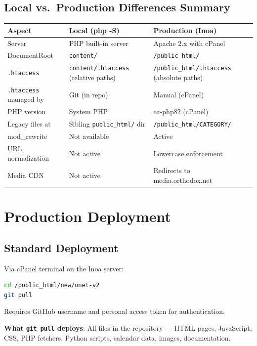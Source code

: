 \documentclass[12pt]{article}
\begin{document}
\subsection{Local vs.\ Production Differences Summary}

\begin{longtable}{p{3cm}p{4.8cm}p{4.8cm}}
\toprule
\textbf{Aspect} & \textbf{Local (php -S)} & \textbf{Production (Inoa)} \\
\midrule
Server & PHP built-in server & Apache 2.x with cPanel \\
DocumentRoot & \texttt{content/} & \texttt{/public\_html/} \\
\texttt{.htaccess} & \texttt{content/.htaccess} (relative paths) & \texttt{/public\_html/.htaccess} (absolute paths) \\
\texttt{.htaccess} managed by & Git (in repo) & Manual (cPanel) \\
PHP version & System PHP & ea-php82 (cPanel) \\
Legacy files at & Sibling \texttt{public\_html/} dir & \texttt{/public\_html/CATEGORY/} \\
mod\_rewrite & Not available & Active \\
URL normalization & Not active & Lowercase enforcement \\
Media CDN & Not active & Redirects to media.orthodox.net \\
\bottomrule
\end{longtable}

\section{Production Deployment}

\subsection{Standard Deployment}

Via cPanel terminal on the Inoa server:

\begin{lstlisting}[language=bash,numbers=none]
cd /public_html/new/onet-v2
git pull
\end{lstlisting}

Requires GitHub username and personal access token for authentication.

\textbf{What \texttt{git pull} deploys}: All files in the repository --- HTML pages, JavaScript, CSS, PHP fetchers, Python scripts, calendar data, images, documentation.
\end{document}
